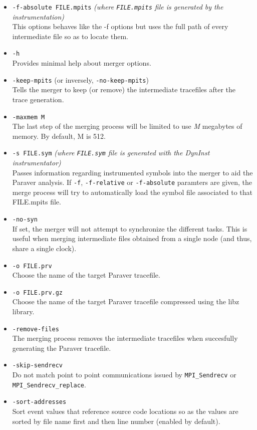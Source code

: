 \begin{itemize}
 \item {\tt -f-absolute FILE.mpits} {\em (where {\tt FILE.mpits} file is generated by the instrumentation)}\\
 This options behaves like the -f options but uses the full path of every intermediate file so as to locate them.
 \item {\tt -h}\\
 Provides minimal help about merger options.
 \item {\tt -keep-mpits} (or inversely, {\tt -no-keep-mpits})\\
 Tells the merger to keep (or remove) the intermediate tracefiles after the trace generation.
 \item {\tt -maxmem M}\\
 The last step of the merging process will be limited to use {\em M} megabytes of memory. By default, M is 512.
 \item {\tt -s FILE.sym} {\em (where {\tt FILE.sym} file is generated with the DynInst instrumentator)}\\
 Passes information regarding instrumented symbols into the merger to aid the Paraver analysis. If {\tt -f}, {\tt -f-relative} or {\tt -f-absolute} paramters are given, the merge process will try to automatically load the symbol file associated to that FILE.mpits file.
 \item {\tt -no-syn}\\
 If set, the merger will not attempt to synchronize the different tasks. This is useful when merging intermediate files obtained from a single node (and thus, share a single clock).
 \item {\tt -o FILE.prv}\\
 Choose the name of the target Paraver tracefile.
 \item {\tt -o FILE.prv.gz}\\
 Choose the name of the target Paraver tracefile compressed using the libz library.
 \item {\tt -remove-files}\\
 The merging process removes the intermediate tracefiles when succesfully generating the Paraver tracefile.
 \item {\tt -skip-sendrecv}\\
 Do not match point to point communications issued by {\tt MPI\_Sendrecv} or {\tt MPI\_Sendrecv\_replace}.
 \item {\tt -sort-addresses}\\
 Sort event values that reference source code locations so as the values are sorted by file name first and then line number (enabled by default).

\end{itemize}
